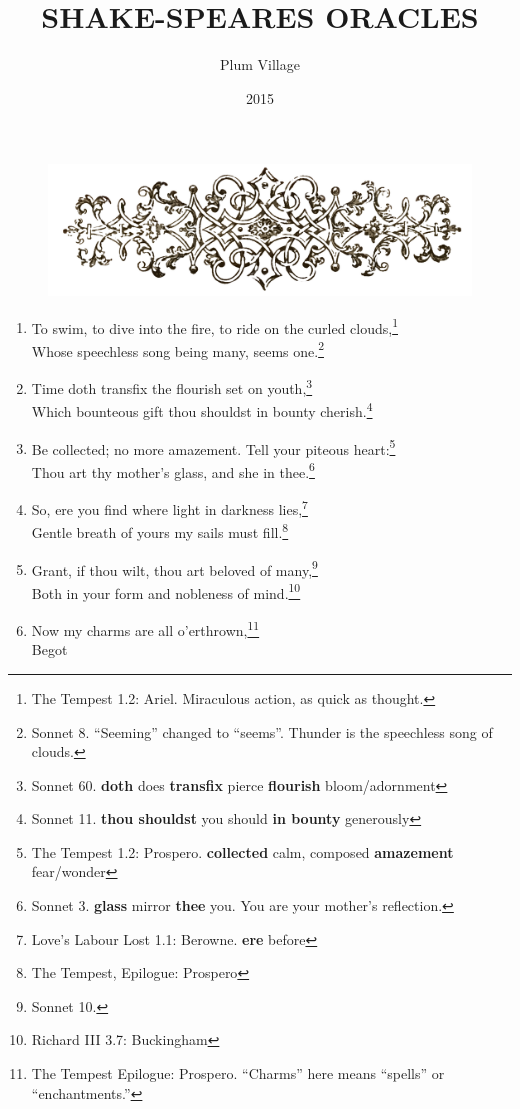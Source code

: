 \documentclass[17pt,twoside]{extarticle}
\title{SHAKE-SPEARES ORACLES}
\author{Plum Village}
\date{2015}
\begin{document}
\thispagestyle{empty}

\begin{figure}[htbp] 
   \centering
   \includegraphics[width=15.5cm]{images/frontispiece.png}
\end{figure}

\begin{enumerate}
\item
  To swim, to dive into the fire, to ride on the curled
  clouds,\footnote{The Tempest 1.2: Ariel. Miraculous action, as quick
    as thought.}\\Whose speechless song being many, seems one.\footnote{Sonnet
    8. ``Seeming'' changed to ``seems''. Thunder is the speechless song
    of clouds.}
\item
  Time doth transfix the flourish set on youth,\footnote{Sonnet 60.
    \textbf{doth} does \textbf{transfix} pierce \textbf{flourish}
    bloom/adornment}\\Which bounteous gift thou shouldst in bounty
  cherish.\footnote{Sonnet 11. \textbf{thou shouldst} you should
    \textbf{in bounty} generously}
\item
  Be collected; no more amazement. Tell your piteous heart:\footnote{The
    Tempest 1.2: Prospero. \textbf{collected} calm, composed
    \textbf{amazement} fear/wonder}\\Thou art thy mother's glass, and
  she in thee.\footnote{Sonnet 3. \textbf{glass} mirror \textbf{thee}
    you. You are your mother's reflection.}
\item
  So, ere you find where light in darkness lies,\footnote{Love's Labour
    Lost 1.1: Berowne. \textbf{ere} before}\\Gentle breath of yours my
  sails must fill.\footnote{The Tempest, Epilogue: Prospero}
\item
  Grant, if thou wilt, thou art beloved of many,\footnote{Sonnet 10.}\\Both
  in your form and nobleness of mind.\footnote{Richard III 3.7:
    Buckingham}
\item
  Now my charms are all o'erthrown,\footnote{The Tempest Epilogue:
    Prospero. ``Charms'' here means ``spells'' or ``enchantments.''}\\Begot

\end{enumerate}
\end{document}
